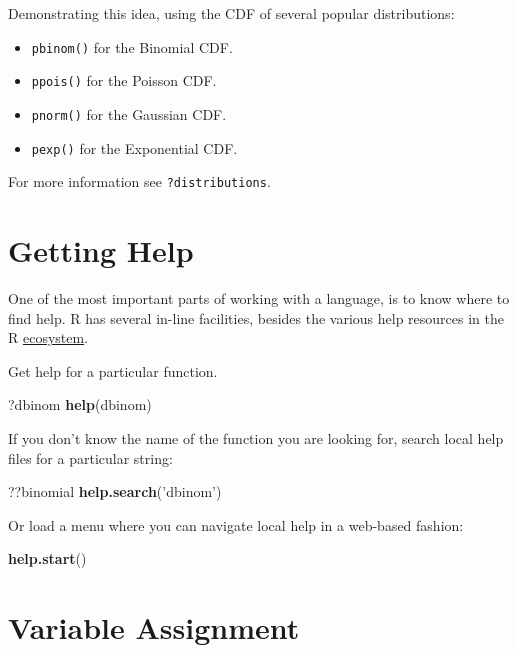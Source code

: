\documentclass[]{book}
\newenvironment{Shaded}{\begin{snugshade}}{\end{snugshade}}
\newcommand{\KeywordTok}[1]{\textcolor[rgb]{0.13,0.29,0.53}{\textbf{#1}}}
\newcommand{\NormalTok}[1]{#1}
\newcommand{\StringTok}[1]{\textcolor[rgb]{0.31,0.60,0.02}{#1}}
\providecommand{\tightlist}{%
  \setlength{\itemsep}{0pt}\setlength{\parskip}{0pt}}
\theoremstyle{definition}
\theoremstyle{definition}
\theoremstyle{definition}
\theoremstyle{remark}
\begin{document}
Demonstrating this idea, using the CDF of several popular distributions:

\begin{itemize}
\tightlist
\item
  \texttt{pbinom()} for the Binomial CDF.
\item
  \texttt{ppois()} for the Poisson CDF.
\item
  \texttt{pnorm()} for the Gaussian CDF.
\item
  \texttt{pexp()} for the Exponential CDF.
\end{itemize}

For more information see \texttt{?distributions}.

\hypertarget{getting-help}{%
\section{Getting Help}\label{getting-help}}

One of the most important parts of working with a language, is to know where to find help.
R has several in-line facilities, besides the various help resources in the R \protect\hyperlink{ecosystem}{ecosystem}.

Get help for a particular function.

\begin{Shaded}
\begin{Highlighting}[]
\NormalTok{?dbinom }
\KeywordTok{help}\NormalTok{(dbinom)}
\end{Highlighting}
\end{Shaded}

If you don't know the name of the function you are looking for, search local help files for a particular string:

\begin{Shaded}
\begin{Highlighting}[]
\NormalTok{??binomial}
\KeywordTok{help.search}\NormalTok{(}\StringTok{'dbinom'}\NormalTok{) }
\end{Highlighting}
\end{Shaded}

Or load a menu where you can navigate local help in a web-based fashion:

\begin{Shaded}
\begin{Highlighting}[]
\KeywordTok{help.start}\NormalTok{() }
\end{Highlighting}
\end{Shaded}

\hypertarget{variable-assignment}{%
\section{Variable Assignment}\label{variable-assignment}}
\end{document}
